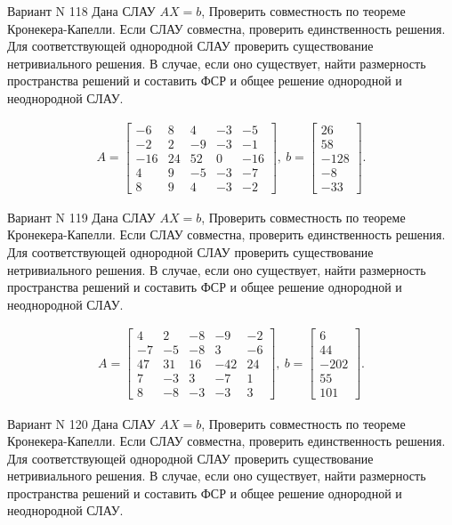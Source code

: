 \documentclass[11pt]{report}
\begin{document}
Вариант N 118
Дана СЛАУ $AX = b$,
Проверить совместность по теореме Кронекера-Капелли. Если СЛАУ совместна, проверить единственность решения.
Для соответствующей однородной СЛАУ проверить существование нетривиального решения. В случае, если оно существует,
найти размерность пространства решений и составить ФСР и общее решение однородной  и неоднородной СЛАУ.


\begin{align*}
 A = \left[\begin{matrix}-6 & 8 & 4 & -3 & -5\\-2 & 2 & -9 & -3 & -1\\-16 & 24 & 52 & 0 & -16\\4 & 9 & -5 & -3 & -7\\8 & 9 & 4 & -3 & -2\end{matrix}\right],
\ b = \left[\begin{matrix}26\\58\\-128\\-8\\-33\end{matrix}\right]. 
 \end{align*}

Вариант N 119
Дана СЛАУ $AX = b$,
Проверить совместность по теореме Кронекера-Капелли. Если СЛАУ совместна, проверить единственность решения.
Для соответствующей однородной СЛАУ проверить существование нетривиального решения. В случае, если оно существует,
найти размерность пространства решений и составить ФСР и общее решение однородной  и неоднородной СЛАУ.


\begin{align*}
 A = \left[\begin{matrix}4 & 2 & -8 & -9 & -2\\-7 & -5 & -8 & 3 & -6\\47 & 31 & 16 & -42 & 24\\7 & -3 & 3 & -7 & 1\\8 & -8 & -3 & -3 & 3\end{matrix}\right],
\ b = \left[\begin{matrix}6\\44\\-202\\55\\101\end{matrix}\right]. 
 \end{align*}

Вариант N 120
Дана СЛАУ $AX = b$,
Проверить совместность по теореме Кронекера-Капелли. Если СЛАУ совместна, проверить единственность решения.
Для соответствующей однородной СЛАУ проверить существование нетривиального решения. В случае, если оно существует,
найти размерность пространства решений и составить ФСР и общее решение однородной  и неоднородной СЛАУ.
\end{document}
